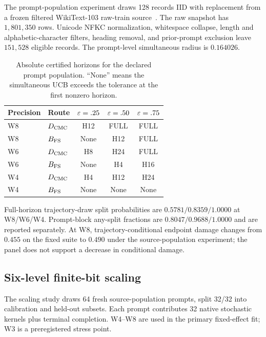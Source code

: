 The prompt-population experiment draws 128 records IID with replacement from a frozen filtered WikiText-103 raw-train source~\citep{merity2017pointer}. The raw snapshot has $1{,}801{,}350$ rows. Unicode NFKC normalization, whitespace collapse, length and alphabetic-character filters, heading removal, and prior-prompt exclusion leave $151{,}528$ eligible records. The prompt-level simultaneous radius is $0.164026$.

\begin{table}[ht]
\caption{Absolute certified horizons for the declared prompt population. ``None'' means the simultaneous UCB exceeds the tolerance at the first nonzero horizon.}
\label{tab:app-pop-horizon}
\centering\small
\begin{tabular}{@{}llccc@{}}
\toprule
Precision & Route & $\varepsilon=.25$ & $\varepsilon=.50$ & $\varepsilon=.75$\\
\midrule
W8 & $D_{\rm CMC}$ & H12 & FULL & FULL\\
W8 & $B_{\rm FS}$ & None & H12 & FULL\\
W6 & $D_{\rm CMC}$ & H8 & H24 & FULL\\
W6 & $B_{\rm FS}$ & None & H4 & H16\\
W4 & $D_{\rm CMC}$ & H4 & H12 & H24\\
W4 & $B_{\rm FS}$ & None & None & None\\
\bottomrule
\end{tabular}
\end{table}

Full-horizon trajectory-draw split probabilities are $0.5781/0.8359/1.0000$ at W8/W6/W4. Prompt-block any-split fractions are $0.8047/0.9688/1.0000$ and are reported separately. At W8, trajectory-conditional endpoint damage changes from $0.455$ on the fixed suite to $0.490$ under the source-population experiment; the panel does not support a decrease in conditional damage.

\subsection{Six-level finite-bit scaling}
The scaling study draws 64 fresh source-population prompts, split 32/32 into calibration and held-out subsets. Each prompt contributes 32 native stochastic kernels plus terminal completion. W4--W8 are used in the primary fixed-effect fit; W3 is a preregistered stress point.

